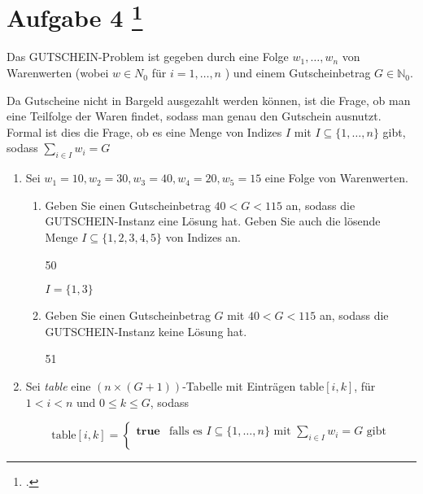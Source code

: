 \documentclass{lehramt-informatik-aufgabe}
\begin{document}
\section{Aufgabe 4
\footcite{66115:2020:09}}

Das GUTSCHEIN-Problem ist gegeben durch eine Folge $w_1, \dots, w_n$ von
Warenwerten (wobei $w \in N_0$ für $i = 1, \dots, n$ ) und einem
Gutscheinbetrag $G \in \mathbb{N}_0$.

Da Gutscheine nicht in Bargeld ausgezahlt werden können, ist die Frage,
ob man eine Teilfolge der Waren findet, sodass man genau den Gutschein
ausnutzt. Formal ist dies die Frage, ob es eine Menge von Indizes $I$ mit
$I \subseteq \{1, \dots, n \}$ gibt, sodass $\sum_{i \in I} w_i = G$
\begin{enumerate}


\item Sei $w_1 = 10, w_2 = 30, w_3 = 40, w_4 = 20, w_5 = 15$ eine Folge
von Warenwerten.

\begin{enumerate}


\item Geben Sie einen Gutscheinbetrag $40 < G < 115$ an, sodass die
GUT\-SCHEIN-Instanz eine Lösung hat. Geben Sie auch die lösende Menge $I
\subseteq \{ 1, 2, 3, 4, 5 \}$ von Indizes an.

\begin{liAntwort}
50

$I = \{ 1, 3 \}$
\end{liAntwort}


\item Geben Sie einen Gutscheinbetrag $G$ mit $40 < G < 115$ an, sodass die
GUTSCHEIN-Instanz keine Lösung hat.

\begin{liAntwort}
51
\end{liAntwort}

\end{enumerate}


\item Sei \emph{table} eine $(n \times (G + 1))$-Tabelle mit Einträgen
$\text{table}[i,k]$, für $1 < i < n$ und $0 \leq k \leq G$, sodass

\begin{liAntwort}
\begin{equation*}
\text{table}[i,k] =
\begin{cases}
\textbf{true} &
\text{falls es } I \subseteq \{1, \dots, n \} \text{ mit }
\sum_{i \in I} w_i = G \text{ gibt}\\


\end{cases}
\end{equation*}
\end{liAntwort}
\end{enumerate}
\end{document}

